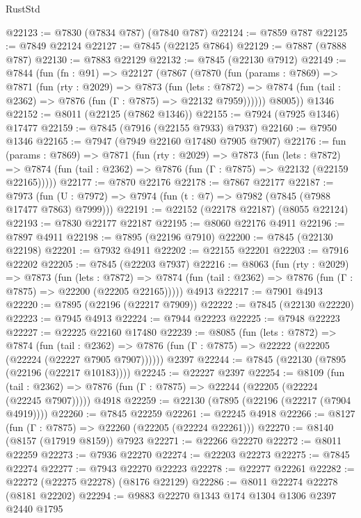 \begin{lexlean}{RustStd}
\begin{coremodule}
@22123 := @7830 (@7834 @787) (@7840 @787)
@22124 := @7859 @787
@22125 := @7849 @22124
@22127 := @7845 (@22125 @7864)
@22129 := @7887 (@7888 @787)
@22130 := @7883 @22129
@22132 := @7845 (@22130 @7912)
@22149 := @7844
    (fun (fn : @91) =>
    @22127
      (@7867
        (@7870
          (fun (params : @7869) =>
          @7871
            (fun (rty : @2029) =>
            @7873
              (fun (lets : @7872) =>
              @7874 (fun (tail : @2362) => @7876 (fun (Γ : @7875) => @22132 @7959))))))
        @8005))
    @1346
@22152 := @8011 (@22125 (@7862 @1346))
@22155 := @7924 (@7925 @1346) @17477
@22159 := @7845 (@7916 (@22155 @7933) @7937)
@22160 := @7950 @1346
@22165 := @7947 (@7949 @22160 @17480 @7905 @7907)
@22176 := fun (params : @7869) =>
  @7871
    (fun (rty : @2029) =>
    @7873
      (fun (lets : @7872) =>
      @7874 (fun (tail : @2362) => @7876 (fun (Γ : @7875) => @22132 (@22159 @22165)))))
@22177 := @7870 @22176
@22178 := @7867 @22177
@22187 := @7973
    (fun (U : @7972) => @7974 (fun (t : @7) => @7982 (@7845 (@7988 @17477 @7863) @7999)))
@22191 := @22152 (@22178 @22187) (@8055 @22124)
@22193 := @7830 @22177 @22187
@22195 := @8060 @22176 @4911
@22196 := @7897 @4911
@22198 := @7895 (@22196 @7910)
@22200 := @7845 (@22130 @22198)
@22201 := @7932 @4911
@22202 := @22155 @22201
@22203 := @7916 @22202
@22205 := @7845 (@22203 @7937)
@22216 := @8063
    (fun (rty : @2029) =>
    @7873
      (fun (lets : @7872) =>
      @7874 (fun (tail : @2362) => @7876 (fun (Γ : @7875) => @22200 (@22205 @22165)))))
    @4913
@22217 := @7901 @4913
@22220 := @7895 (@22196 (@22217 @7909))
@22222 := @7845 (@22130 @22220)
@22223 := @7945 @4913
@22224 := @7944 @22223
@22225 := @7948 @22223
@22227 := @22225 @22160 @17480
@22239 := @8085
    (fun (lets : @7872) =>
    @7874
      (fun (tail : @2362) =>
      @7876 (fun (Γ : @7875) => @22222 (@22205 (@22224 (@22227 @7905 @7907))))))
    @2397
@22244 := @7845 (@22130 (@7895 (@22196 (@22217 @10183))))
@22245 := @22227 @2397
@22254 := @8109
    (fun (tail : @2362) => @7876 (fun (Γ : @7875) => @22244 (@22205 (@22224 (@22245 @7907)))))
    @4918
@22259 := @22130 (@7895 (@22196 (@22217 (@7904 @4919))))
@22260 := @7845 @22259
@22261 := @22245 @4918
@22266 := @8127 (fun (Γ : @7875) => @22260 (@22205 (@22224 @22261)))
@22270 := @8140 (@8157 (@17919 @8159)) @7923
@22271 := @22266 @22270
@22272 := @8011 @22259
@22273 := @7936 @22270
@22274 := @22203 @22273
@22275 := @7845 @22274
@22277 := @7943 @22270 @22223
@22278 := @22277 @22261
@22282 := @22272 (@22275 @22278) (@8176 @22129)
@22286 := @8011 @22274 @22278 (@8181 @22202)
@22294 := @9883 @22270 @1343 @174 @1304 @1306 @2397 @2440 @1795

\end{coremodule}
\end{lexlean}
